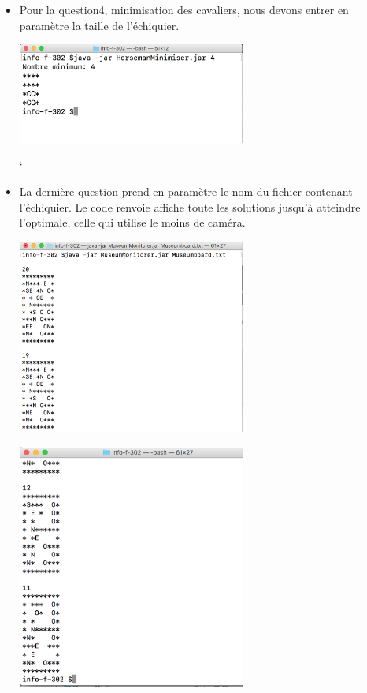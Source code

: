 \documentclass{article}
\begin{document}
\begin{itemize}
\begin{itemize}
\begin{center}
 	\end{center}
 	\end{itemize}
\item Pour la question4, minimisation des cavaliers, nous devons entrer en paramètre la taille de l'échiquier.
 	\begin{center}
 		 	 \includegraphics[width=75mm,scale=0.8]{./Horsemin.png}
 	\end{center}`
\item La dernière question prend en paramètre le nom du fichier contenant l'échiquier. Le code renvoie affiche toute   les solutions jusqu'à atteindre l'optimale, celle qui utilise le moins de caméra. 
 	\begin{center}
 		 	 \includegraphics[width=75mm,scale=0.8]{./musee1.png}
 	\end{center}
 	\begin{center}
 		 	 \includegraphics[width=75mm,scale=0.8]{./musee2.png}
 	\end{center}
\end{itemize}
\end{document}
